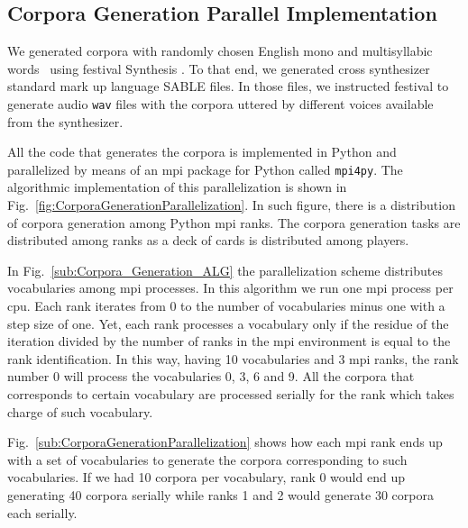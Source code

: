 \documentclass[10pt,journal,compsoc]{IEEEtran}
\begin{document}
\subsection{Corpora Generation Parallel Implementation}
\label{CorpGenImp}

We generated corpora with randomly chosen English mono and multisyllabic words~\cite{Dematties2018} using \gls{festival} Synthesis \cite{festival2014}. To that end, we generated cross synthesizer standard mark up language SABLE \cite{sable} files. In those files, we instructed \gls{festival} to generate audio \texttt{wav} files with the corpora uttered by different voices available from the synthesizer.

All the code that generates the corpora is implemented in Python and parallelized by means of an \gls{mpi} package for Python called \texttt{mpi4py}. The algorithmic implementation of this parallelization is shown in Fig.~\ref{fig:CorporaGenerationParallelization}. In such figure, there is a distribution of corpora generation among Python \gls{mpi} ranks. The corpora generation tasks are distributed among ranks as a deck of cards is distributed among players.

In Fig.~\ref{sub:Corpora_Generation_ALG} the parallelization scheme distributes vocabularies among \gls{mpi} processes. In this algorithm we run one \gls{mpi} process per \gls{cpu}. Each rank iterates from 0 to the number of vocabularies minus one with a step size of one. Yet, each rank processes a vocabulary only if the residue of the iteration divided by the number of ranks in the \gls{mpi} environment is equal to the rank identification. In this way, having 10 vocabularies and 3 \gls{mpi} ranks, the rank number 0 will process the vocabularies 0, 3, 6 and 9. All the corpora that corresponds to certain vocabulary are processed serially for the rank which takes charge of such vocabulary.

Fig.~\ref{sub:CorporaGenerationParallelization} shows how each \gls{mpi} rank ends up with a set of vocabularies to generate the corpora corresponding to such vocabularies. If we had 10 corpora per vocabulary, rank 0 would end up generating 40 corpora serially while ranks 1 and 2 would generate 30 corpora each serially.

\end{document}
